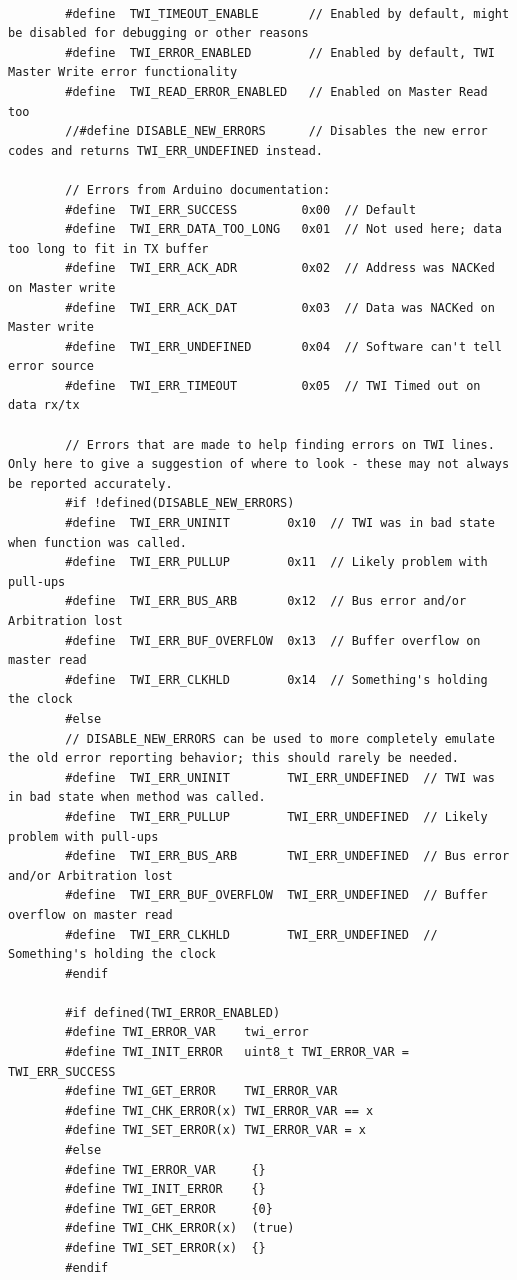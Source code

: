 \documentclass[11pt,a4paper,titlepage]{report}
\begin{document}
\begin{lstlisting}
		
		#define  TWI_TIMEOUT_ENABLE       // Enabled by default, might be disabled for debugging or other reasons
		#define  TWI_ERROR_ENABLED        // Enabled by default, TWI Master Write error functionality
		#define  TWI_READ_ERROR_ENABLED   // Enabled on Master Read too
		//#define DISABLE_NEW_ERRORS      // Disables the new error codes and returns TWI_ERR_UNDEFINED instead.
		
		// Errors from Arduino documentation:
		#define  TWI_ERR_SUCCESS         0x00  // Default
		#define  TWI_ERR_DATA_TOO_LONG   0x01  // Not used here; data too long to fit in TX buffer
		#define  TWI_ERR_ACK_ADR         0x02  // Address was NACKed on Master write
		#define  TWI_ERR_ACK_DAT         0x03  // Data was NACKed on Master write
		#define  TWI_ERR_UNDEFINED       0x04  // Software can't tell error source
		#define  TWI_ERR_TIMEOUT         0x05  // TWI Timed out on data rx/tx
		
		// Errors that are made to help finding errors on TWI lines. Only here to give a suggestion of where to look - these may not always be reported accurately.
		#if !defined(DISABLE_NEW_ERRORS)
		#define  TWI_ERR_UNINIT        0x10  // TWI was in bad state when function was called.
		#define  TWI_ERR_PULLUP        0x11  // Likely problem with pull-ups
		#define  TWI_ERR_BUS_ARB       0x12  // Bus error and/or Arbitration lost
		#define  TWI_ERR_BUF_OVERFLOW  0x13  // Buffer overflow on master read
		#define  TWI_ERR_CLKHLD        0x14  // Something's holding the clock
		#else
		// DISABLE_NEW_ERRORS can be used to more completely emulate the old error reporting behavior; this should rarely be needed.
		#define  TWI_ERR_UNINIT        TWI_ERR_UNDEFINED  // TWI was in bad state when method was called.
		#define  TWI_ERR_PULLUP        TWI_ERR_UNDEFINED  // Likely problem with pull-ups
		#define  TWI_ERR_BUS_ARB       TWI_ERR_UNDEFINED  // Bus error and/or Arbitration lost
		#define  TWI_ERR_BUF_OVERFLOW  TWI_ERR_UNDEFINED  // Buffer overflow on master read
		#define  TWI_ERR_CLKHLD        TWI_ERR_UNDEFINED  // Something's holding the clock
		#endif
		
		#if defined(TWI_ERROR_ENABLED)
		#define TWI_ERROR_VAR    twi_error
		#define TWI_INIT_ERROR   uint8_t TWI_ERROR_VAR = TWI_ERR_SUCCESS
		#define TWI_GET_ERROR    TWI_ERROR_VAR
		#define TWI_CHK_ERROR(x) TWI_ERROR_VAR == x
		#define TWI_SET_ERROR(x) TWI_ERROR_VAR = x
		#else
		#define TWI_ERROR_VAR     {}
		#define TWI_INIT_ERROR    {}
		#define TWI_GET_ERROR     {0}
		#define TWI_CHK_ERROR(x)  (true)
		#define TWI_SET_ERROR(x)  {}
		#endif
		

\end{lstlisting}
\end{document}
